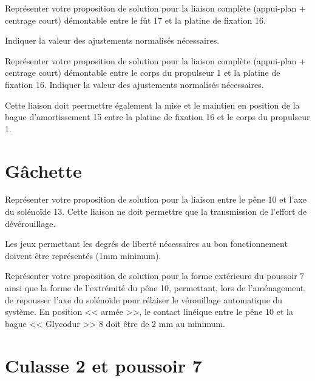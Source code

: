 \documentclass[11pt]{article}
\begin{document}
\UPSTIquestion Représenter votre proposition de solution pour la liaison complète (appui-plan + centrage court) démontable entre le fût 17 et la platine de fixation 16. 

Indiquer la valeur des ajustements normalisés nécessaires.
\begin{UPSTIcorrige}
\end{UPSTIcorrige}

\UPSTIquestion Représenter votre proposition de solution pour la liaison complète (appui-plan + centrage court) démontable entre le corps du propulseur 1 et la platine de fixation 16. Indiquer la valeur des ajustements normalisés nécessaires.

Cette liaison doit peermettre également la mise et le maintien en position de la bague d'amortissement 15 entre la platine de fixation 16 et le corps du propulseur 1. 

\begin{UPSTIcorrige}
\end{UPSTIcorrige}

\section{Gâchette}

\UPSTIquestion* Représenter votre proposition de solution pour la liaison entre le pêne 10 et l'axe du solénoïde 13. Cette liaison ne doit permettre que la transmission de l'effort de dévérouillage. 

Les jeux permettant les degrés de liberté nécessaires au bon fonctionnement doivent être représentés (1mm minimum). 
\begin{UPSTIcorrige}
\end{UPSTIcorrige}

\UPSTIquestion Représenter votre proposition de solution pour la forme extérieure du poussoir 7 ainsi que la forme de l'extrémité du pêne 10, permettant, lors de l'aménagement, de repousser l'axe du solénoïde pour rélaiser le vérouillage automatique du système. En position << armée >>, le contact linéique entre le pêne 10 et la bague << Glycodur >> 8 doit être de 2 mm au minimum.
\begin{UPSTIcorrige}
\end{UPSTIcorrige}

\section{Culasse 2 et poussoir 7}
\end{document}
